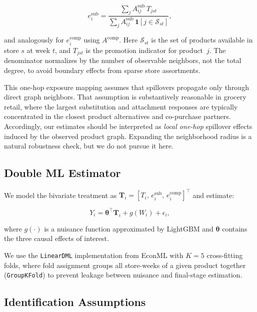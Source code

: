 \documentclass[conference]{IEEEtran}
\begin{document}
\begin{equation}
    e_i^{\mathrm{sub}} = \frac{\sum_{j} A^{\mathrm{sub}}_{ij}\, T_{jst}}%
    {\sum_{j} A^{\mathrm{sub}}_{ij}\, \mathbf{1}[j \in \mathcal{S}_{st}]},
    \label{eq:exposure}
\end{equation}

\noindent and analogously for $e_i^{\mathrm{comp}}$ using $A^{\mathrm{comp}}$.
Here $\mathcal{S}_{st}$ is the set of products available in store $s$ at
week $t$, and $T_{jst}$ is the promotion indicator for product~$j$.
The denominator normalizes by the number of observable neighbors, not the
total degree, to avoid boundary effects from sparse store assortments.

This one-hop exposure mapping assumes that spillovers propagate only through
direct graph neighbors.
That assumption is substantively reasonable in grocery retail, where the
largest substitution and attachment responses are typically concentrated in
the closest product alternatives and co-purchase partners.
Accordingly, our estimates should be interpreted as \emph{local one-hop}
spillover effects induced by the observed product graph.
Expanding the neighborhood radius is a natural robustness check, but we do
not pursue it here.

\subsection{Double ML Estimator}

We model the bivariate treatment as
$\mathbf{T}_i = [T_i,\, e_i^{\mathrm{sub}},\, e_i^{\mathrm{comp}}]^\top$
and estimate:

\begin{equation}
    Y_i = \boldsymbol{\theta}^\top \mathbf{T}_i + g(W_i) + \epsilon_i,
    \label{eq:model}
\end{equation}

\noindent where $g(\cdot)$ is a nuisance function approximated by
LightGBM \cite{ke2017lightgbm} and $\boldsymbol{\theta}$ contains
the three causal effects of interest.

We use the \texttt{LinearDML} implementation from EconML
\cite{battocchi2019econml} with $K=5$ cross-fitting folds, where fold
assignment groups all store-weeks of a given product together
(\texttt{GroupKFold}) to prevent leakage between nuisance and final-stage
estimation.

\subsection{Identification Assumptions}
\end{document}
